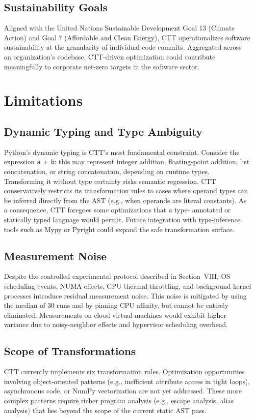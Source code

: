 \documentclass[conference]{IEEEtran}
\begin{document}
\subsection{Sustainability Goals}
Aligned with the United Nations Sustainable Development Goal 13 (Climate
Action) and Goal 7 (Affordable and Clean Energy), CTT operationalizes software
sustainability at the granularity of individual code commits.  Aggregated
across an organization's codebase, CTT-driven optimization could contribute
meaningfully to corporate net-zero targets in the software sector.

\section{Limitations}

\subsection{Dynamic Typing and Type Ambiguity}
Python's dynamic typing is CTT's most fundamental constraint.  Consider the
expression \texttt{a + b}: this may represent integer addition, floating-point
addition, list concatenation, or string concatenation, depending on runtime
types.  Transforming it without type certainty risks semantic regression.
CTT conservatively restricts its transformation rules to cases where operand
types can be inferred directly from the AST (e.g., when operands are literal
constants).  As a consequence, CTT foregoes some optimizations that a type-
annotated or statically typed language would permit.  Future integration with
type-inference tools such as Mypy or Pyright could expand the safe
transformation surface.

\subsection{Measurement Noise}
Despite the controlled experimental protocol described in Section~VIII, OS
scheduling events, NUMA effects, CPU thermal throttling, and background
kernel processes introduce residual measurement noise.  This noise is mitigated
by using the median of 30 runs and by pinning CPU affinity, but cannot be
entirely eliminated.  Measurements on cloud virtual machines would exhibit
higher variance due to noisy-neighbor effects and hypervisor scheduling
overhead.

\subsection{Scope of Transformations}
CTT currently implements six transformation rules.  Optimization opportunities
involving object-oriented patterns (e.g., inefficient attribute access in tight
loops), asynchronous code, or NumPy vectorization are not yet addressed.
These more complex patterns require richer program analysis (e.g., escape
analysis, alias analysis) that lies beyond the scope of the current static
AST pass.
\end{document}
